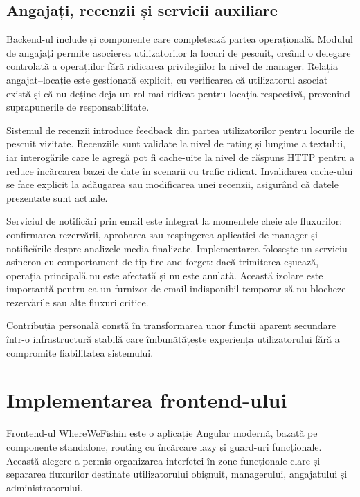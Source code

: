 \subsection{Angajați, recenzii și servicii auxiliare}

Backend-ul include și componente care completează partea operațională. Modulul de angajați permite asocierea utilizatorilor la locuri de pescuit, creând o delegare controlată a operațiilor fără ridicarea privilegiilor la nivel de manager. Relația angajat–locație este gestionată explicit, cu verificarea că utilizatorul asociat există și că nu deține deja un rol mai ridicat pentru locația respectivă, prevenind suprapunerile de responsabilitate.

Sistemul de recenzii introduce feedback din partea utilizatorilor pentru locurile de pescuit vizitate. Recenziile sunt validate la nivel de rating și lungime a textului, iar interogările care le agregă pot fi cache-uite la nivel de răspuns HTTP pentru a reduce încărcarea bazei de date în scenarii cu trafic ridicat. Invalidarea cache-ului se face explicit la adăugarea sau modificarea unei recenzii, asigurând că datele prezentate sunt actuale.

Serviciul de notificări prin email este integrat la momentele cheie ale fluxurilor: confirmarea rezervării, aprobarea sau respingerea aplicației de manager și notificările despre analizele media finalizate. Implementarea folosește un serviciu asincron cu comportament de tip fire-and-forget: dacă trimiterea eșuează, operația principală nu este afectată și nu este anulată. Această izolare este importantă pentru ca un furnizor de email indisponibil temporar să nu blocheze rezervările sau alte fluxuri critice.

Contribuția personală constă în transformarea unor funcții aparent secundare într-o infrastructură stabilă care îmbunătățește experiența utilizatorului fără a compromite fiabilitatea sistemului.

\section{Implementarea frontend-ului}

Frontend-ul WhereWeFishin este o aplicație Angular modernă, bazată pe componente standalone, routing cu încărcare lazy și guard-uri funcționale. Această alegere a permis organizarea interfeței în zone funcționale clare și separarea fluxurilor destinate utilizatorului obișnuit, managerului, angajatului și administratorului.

